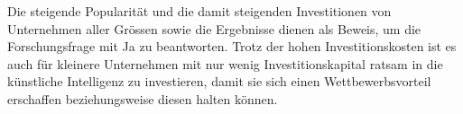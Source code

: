 {    Die steigende Popularität und die damit steigenden Investitionen von Unternehmen aller Grössen sowie die Ergebnisse dienen als Beweis, um die Forschungsfrage mit Ja zu beantworten. Trotz der hohen Investitionskosten ist es auch für kleinere Unternehmen mit nur wenig Investitionskapital ratsam in die künstliche Intelligenz zu investieren, damit sie sich einen Wettbewerbsvorteil erschaffen beziehungsweise diesen halten können.
    
}

\newpage

\tableofcontents

\cleardoublepage


\cleardoublepage


